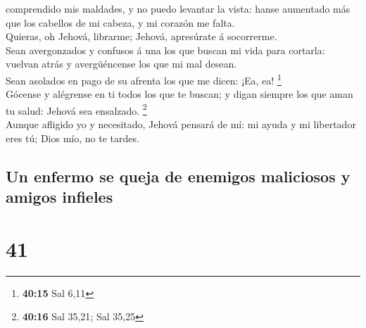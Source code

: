 comprendido mis maldades, y no puedo levantar la vista: hanse aumentado
más que los cabellos de mi cabeza, y mi corazón me falta.\\
 Quieras, oh Jehová, librarme; Jehová, apresúrate á
socorrerme.\\
 Sean avergonzados y confusos á una los que buscan mi
vida para cortarla: vuelvan atrás y avergüéncense los que mi mal
desean.\\
 Sean asolados en pago de su afrenta los que me dicen:
¡Ea, ea! \footnote{\textbf{40:15} Sal 6,11}\\
 Gócense y alégrense en ti todos los que te buscan; y
digan siempre los que aman tu salud: Jehová sea ensalzado. \footnote{\textbf{40:16}
  Sal 35,21; Sal 35,25}\\
 Aunque afligido yo y necesitado, Jehová pensará de mí:
mi ayuda y mi libertador eres tú; Dios mío, no te tardes.

\hypertarget{un-enfermo-se-queja-de-enemigos-maliciosos-y-amigos-infieles}{%
\subsection{Un enfermo se queja de enemigos maliciosos y amigos
infieles}\label{un-enfermo-se-queja-de-enemigos-maliciosos-y-amigos-infieles}}

\hypertarget{section-40}{%
\section{41}\label{section-40}}

